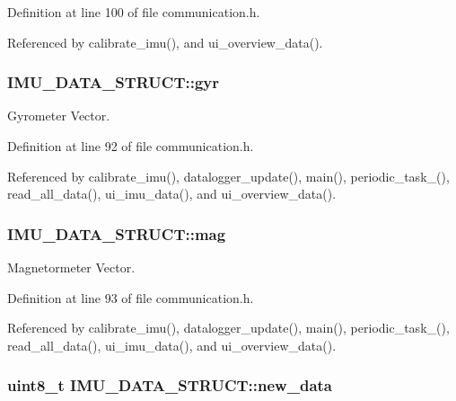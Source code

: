 Definition at line 100 of file communication.\-h.



Referenced by calibrate\-\_\-imu(), and ui\-\_\-overview\-\_\-data().

\hypertarget{structIMU__DATA__STRUCT_a0c1ac26626e4434a2ee124a1928a23a1}{
\subsubsection[{gyr}]{ I\-M\-U\-\_\-\-D\-A\-T\-A\-\_\-\-S\-T\-R\-U\-C\-T\-::gyr}}\label{structIMU__DATA__STRUCT_a0c1ac26626e4434a2ee124a1928a23a1}


Gyrometer Vector. 



Definition at line 92 of file communication.\-h.



Referenced by calibrate\-\_\-imu(), datalogger\-\_\-update(), main(), periodic\-\_\-task\-\_(), read\-\_\-all\-\_\-data(), ui\-\_\-imu\-\_\-data(), and ui\-\_\-overview\-\_\-data().

\hypertarget{structIMU__DATA__STRUCT_a40c7df8b6d49297aa52873cfd9b60daa}{
\subsubsection[{mag}]{ I\-M\-U\-\_\-\-D\-A\-T\-A\-\_\-\-S\-T\-R\-U\-C\-T\-::mag}}\label{structIMU__DATA__STRUCT_a40c7df8b6d49297aa52873cfd9b60daa}


Magnetormeter Vector. 



Definition at line 93 of file communication.\-h.



Referenced by calibrate\-\_\-imu(), datalogger\-\_\-update(), main(), periodic\-\_\-task\-\_(), read\-\_\-all\-\_\-data(), ui\-\_\-imu\-\_\-data(), and ui\-\_\-overview\-\_\-data().

\hypertarget{structIMU__DATA__STRUCT_a99924252176326418863e511d4fa437b}{
\subsubsection[{new\-\_\-data}]{\setlength{\rightskip}{0pt plus 5cm}uint8\-\_\-t I\-M\-U\-\_\-\-D\-A\-T\-A\-\_\-\-S\-T\-R\-U\-C\-T\-::new\-\_\-data}}\label{structIMU__DATA__STRUCT_a99924252176326418863e511d4fa437b}



